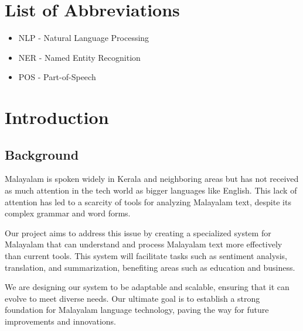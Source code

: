 \documentclass[12pt,a4paper,titlepage]{report}
\begin{document}
	\listoffigures
	\newpage
	

	\listoftables
    \newpage
    
    \chapter*{List of Abbreviations}
    \begin{itemize}
    	\item NLP - Natural Language Processing
    	\item NER - Named Entity Recognition
    	\item POS - Part-of-Speech
    \end{itemize}
    
     
    
    \newpage
    
	\cleardoublepage
	
	\setcounter{page}{1}
	\chapter{Introduction}
	
	\section{Background}
	
	Malayalam is spoken widely in Kerala and neighboring areas but has not received as much attention in the tech world as bigger languages like English. This lack of attention has led to a scarcity of tools for analyzing Malayalam text, despite its complex grammar and word forms.
	
	Our project aims to address this issue by creating a specialized system for Malayalam that can understand and process Malayalam text more effectively than current tools. This system will facilitate tasks such as sentiment analysis, translation, and summarization, benefiting areas such as education and business.
	
	We are designing our system to be adaptable and scalable, ensuring that it can evolve to meet diverse needs. Our ultimate goal is to establish a strong foundation for Malayalam language technology, paving the way for future improvements and innovations.
	
\end{document}
